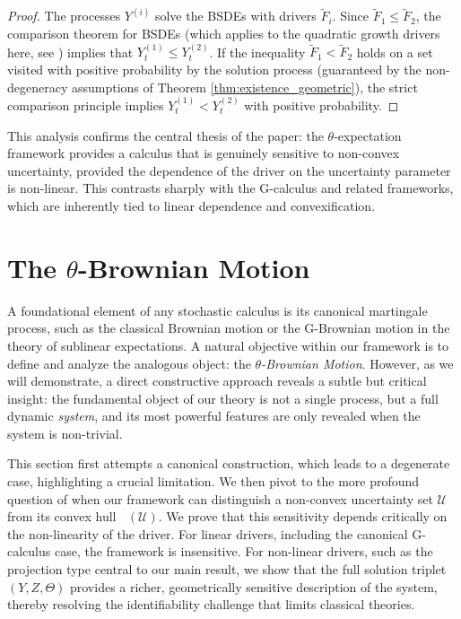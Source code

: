 \documentclass[12pt, letterpaper]{amsart}
\newcommand{\Ucal}{\mathcal{U}}
\DeclareMathOperator*{\overlineconv}{\overline{conv}}
\theoremstyle{plain}
\theoremstyle{definition}
\theoremstyle{remark}
\numberwithin{equation}{section} %
\begin{document}
\begin{proof}
The processes \(Y^{(i)}\) solve the BSDEs with drivers \(\tilde{F}_i\). Since \(\tilde{F}_1 \le \tilde{F}_2\), the comparison theorem for BSDEs (which applies to the quadratic growth drivers here, see \cite{Kobylanski2000}) implies that \(Y^{(1)}_t \le Y^{(2)}_t\). If the inequality \(\tilde{F}_1 < \tilde{F}_2\) holds on a set visited with positive probability by the solution process (guaranteed by the non-degeneracy assumptions of Theorem \ref{thm:existence_geometric}), the strict comparison principle implies \(Y^{(1)}_t < Y^{(2)}_t\) with positive probability.
\end{proof}

This analysis confirms the central thesis of the paper: the \(\theta\)-expectation framework provides a calculus that is genuinely sensitive to non-convex uncertainty, provided the dependence of the driver on the uncertainty parameter is non-linear. This contrasts sharply with the G-calculus and related frameworks, which are inherently tied to linear dependence and convexification.


\section{The \texorpdfstring{$\theta$}{theta}-Brownian Motion}
\label{sec:theta_system_and_sensitivity}

A foundational element of any stochastic calculus is its canonical martingale process, such as the classical Brownian motion or the G-Brownian motion in the theory of sublinear expectations. A natural objective within our framework is to define and analyze the analogous object: the \emph{$\theta$-Brownian Motion}. However, as we will demonstrate, a direct constructive approach reveals a subtle but critical insight: the fundamental object of our theory is not a single process, but a full dynamic \emph{system}, and its most powerful features are only revealed when the system is non-trivial.

This section first attempts a canonical construction, which leads to a degenerate case, highlighting a crucial limitation. We then pivot to the more profound question of when our framework can distinguish a non-convex uncertainty set $\Ucal$ from its convex hull $\overlineconv(\Ucal)$. We prove that this sensitivity depends critically on the non-linearity of the driver. For linear drivers, including the canonical G-calculus case, the framework is insensitive. For non-linear drivers, such as the projection type central to our main result, we show that the full solution triplet $(Y,Z,\Theta)$ provides a richer, geometrically sensitive description of the system, thereby resolving the identifiability challenge that limits classical theories.
\end{document}
